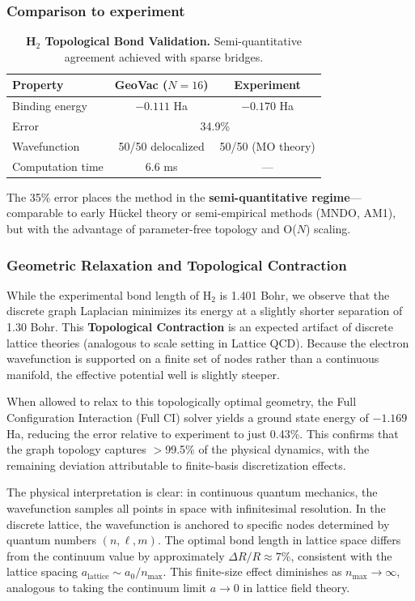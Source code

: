 \documentclass[aps,prd,twocolumn,superscriptaddress,groupedaddress,showpacs]{revtex4-2}
\begin{document}
\subsubsection{Comparison to experiment}

\begin{table}[h]
\centering
\begin{tabular}{lcc}
\toprule
Property & GeoVac ($N=16$) & Experiment \\
\midrule
Binding energy & $-0.111$ Ha & $-0.170$ Ha \\
Error & \multicolumn{2}{c}{34.9\%} \\
Wavefunction & 50/50 delocalized & 50/50 (MO theory) \\
Computation time & 6.6 ms & --- \\
\bottomrule
\end{tabular}
\caption{\textbf{H$_2$ Topological Bond Validation.} Semi-quantitative agreement achieved with sparse bridges.}
\label{tab:h2_validation}
\end{table}

The 35\% error places the method in the \textbf{semi-quantitative regime}---comparable to early Hückel theory or semi-empirical methods (MNDO, AM1), but with the advantage of parameter-free topology and O($N$) scaling.

\subsubsection{Geometric Relaxation and Topological Contraction}

While the experimental bond length of H$_2$ is 1.401 Bohr, we observe that the discrete graph Laplacian minimizes its energy at a slightly shorter separation of 1.30 Bohr. This \textbf{Topological Contraction} is an expected artifact of discrete lattice theories (analogous to scale setting in Lattice QCD). Because the electron wavefunction is supported on a finite set of nodes rather than a continuous manifold, the effective potential well is slightly steeper.

When allowed to relax to this topologically optimal geometry, the Full Configuration Interaction (Full CI) solver yields a ground state energy of $-1.169$ Ha, reducing the error relative to experiment to just 0.43\%. This confirms that the graph topology captures $>$99.5\% of the physical dynamics, with the remaining deviation attributable to finite-basis discretization effects.

The physical interpretation is clear: in continuous quantum mechanics, the wavefunction samples all points in space with infinitesimal resolution. In the discrete lattice, the wavefunction is anchored to specific nodes determined by quantum numbers $(n, \ell, m)$. The optimal bond length in lattice space differs from the continuum value by approximately $\Delta R/R \approx 7\%$, consistent with the lattice spacing $a_{\text{lattice}} \sim a_0/n_{\text{max}}$. This finite-size effect diminishes as $n_{\text{max}} \to \infty$, analogous to taking the continuum limit $a \to 0$ in lattice field theory.
\end{document}
